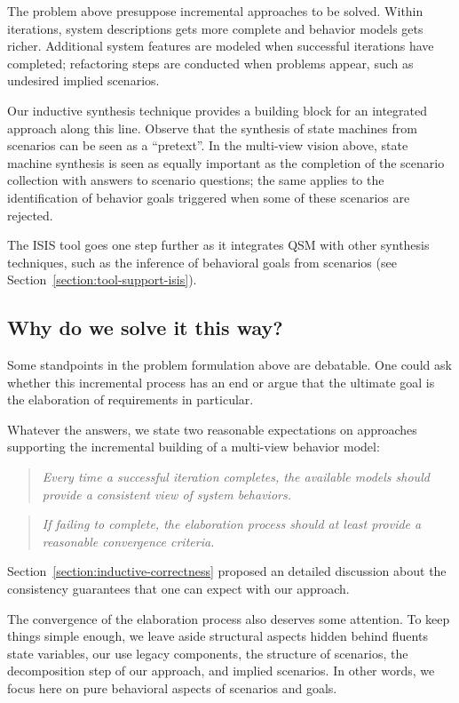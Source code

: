 The problem above presuppose incremental approaches to be solved. Within iterations, system descriptions gets more complete and behavior models gets richer. Additional system features are modeled when successful iterations have completed; refactoring steps are conducted when problems appear, such as undesired implied scenarios.

Our inductive synthesis technique provides a building block for an integrated approach along this line. Observe that the synthesis of state machines from scenarios can be seen as a ``pretext''. In the multi-view vision above, state machine synthesis is seen as equally important as the completion of the scenario collection with answers to scenario questions; the same applies to the identification of behavior goals triggered when some of these scenarios are rejected. 

The ISIS tool goes one step further as it integrates QSM with other synthesis techniques, such as the inference of behavioral goals from scenarios (see Section~\ref{section:tool-support-isis}).

\subsection{Why do we solve it this way?}

Some standpoints in the problem formulation above are debatable. One could ask whether this incremental process has an end or argue that the ultimate goal is the elaboration of requirements in particular. 

Whatever the answers, we state two reasonable expectations on approaches supporting the incremental building of a multi-view behavior model:
\begin{quotation}
\emph{Every time a successful iteration completes, the available models should provide a consistent view of system behaviors.}
\end{quotation}
\begin{quotation}
\emph{If failing to complete, the elaboration process should at least provide a reasonable convergence criteria.}
\end{quotation}

Section~\ref{section:inductive-correctness} proposed an detailed discussion about the consistency guarantees that one can expect with our approach.

The convergence of the elaboration process also deserves some attention. To keep things simple enough, we leave aside structural aspects hidden behind fluents state variables, our use legacy components, the structure of scenarios, the decomposition step of our approach, and implied scenarios. In other words, we focus here on pure behavioral aspects of scenarios and goals.

